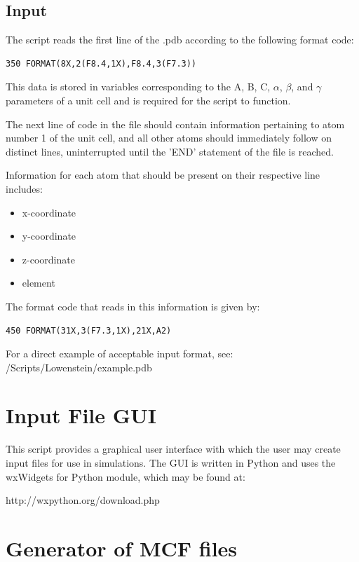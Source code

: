 \subsection{Input} \label{sec:Input}
The script reads the first line of the .pdb according to the following format code:

\begin{lstlisting}[firstnumber=184, caption=Lowenstein\_Script.f90]
    350 FORMAT(8X,2(F8.4,1X),F8.4,3(F7.3))
\end{lstlisting}

This data is stored in variables corresponding to the A, B, C, $\alpha$, $\beta$, and $\gamma$   
parameters of a unit cell and is required for the script to function.

The next line of code in the file should contain information pertaining to atom number 1 of the unit cell, and 
all other atoms should immediately follow on distinct lines, uninterrupted until the 'END' statement of the file is reached.

Information for each atom that should be present on their respective line includes:
\begin{itemize}
\item x-coordinate
\item y-coordinate
\item z-coordinate
\item element
\end{itemize}

The format code that reads in this information is given by:

\begin{lstlisting}[firstnumber=231, caption=Lowenstein\_Script.f90]
    450 FORMAT(31X,3(F7.3,1X),21X,A2)
\end{lstlisting}

For a direct example of acceptable input format, see:  /Scripts/Lowenstein/example.pdb

\section{Input File GUI} \label{Sec:GUI}
This script provides a graphical user interface with which the user may create input files for use in simulations.  The GUI is written
 in Python and uses the wxWidgets for Python module, which may be found at:   

http://wxpython.org/download.php 

\section{Generator of MCF files}
\label{utility:mcfgen}

